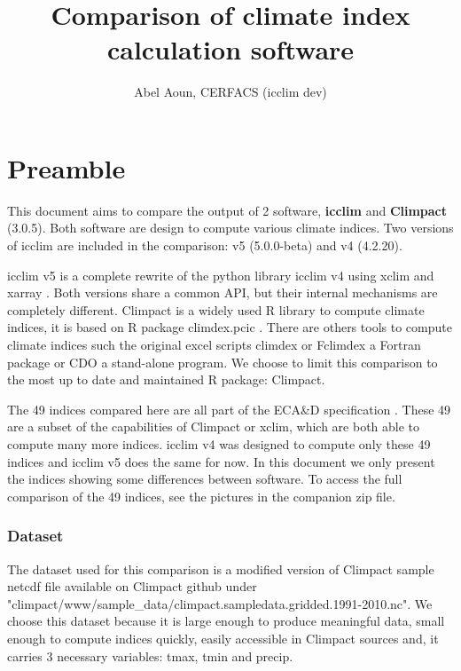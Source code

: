\documentclass[a4paper,11pt]{article}
\title{Comparison of climate index calculation software}
\author{Abel Aoun, CERFACS (icclim dev)}
\begin{document}
\maketitle
\part*{Preamble}
    This document aims to compare the output of 2 software, \textbf{icclim} \cite{gh/icclim} and \textbf{Climpact} \cite{gh/Climpact} (3.0.5). Both software are design to compute various climate indices.
    Two versions of icclim are included in the comparison: v5 (5.0.0-beta) and v4 (4.2.20).

    icclim v5 is a complete rewrite of the python library icclim v4 using xclim \cite{gh/xclim} and xarray \cite{gh/xarray}. Both versions share a common API, but their internal mechanisms are completely different.
    Climpact is a widely used R library to compute climate indices, it is based on R package climdex.pcic \cite{gh/climdex}.
    There are others tools to compute climate indices such the original excel scripts climdex \cite{doc/climdex} or Fclimdex \cite{gh/fclimdex} a Fortran package or CDO \cite{doc/cdo_eca} a stand-alone program.
    We choose to limit this comparison to the most up to date and maintained R package: Climpact.

    The 49 indices compared here are all part of the ECA\&D specification \cite{doc/ecad_new}.
    These 49 are a subset of the capabilities of Climpact or xclim, which are both able to compute many more indices.
    icclim v4 was designed to compute only these 49 indices and icclim v5 does the same for now.
    In this document we only present the indices showing some differences between software.
    To access the full comparison of the 49 indices, see the pictures in the companion zip file.

    \section{Dataset}
        The dataset used for this comparison is a modified version of Climpact sample netcdf file available on Climpact github \cite{gh/Climpact} under "climpact/www/sample\_data/climpact.sampledata.gridded.1991-2010.nc".
        We choose this dataset because it is large enough to produce meaningful data, small enough to compute indices quickly, 
        easily accessible in Climpact sources and, it carries 3 necessary variables: tmax, tmin and precip.
\end{document}
